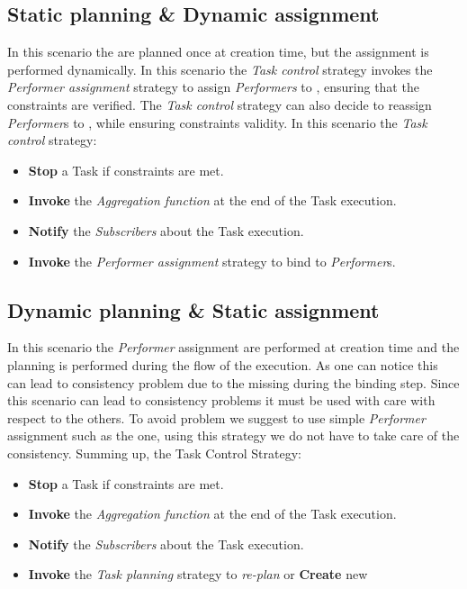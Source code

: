 \subsection{Static \utask{} planning \& Dynamic assignment}
\label{subs:static-dynamic}
In this scenario the \utask{} are planned once at creation time, but the
assignment is performed dynamically. In this scenario the \emph{Task control}
strategy invokes the \emph{Performer assignment} strategy to assign
\emph{Performers} to \utask{}, ensuring that the constraints are verified. The
\emph{Task control} strategy can also decide to reassign \emph{Performer}s to
\utask{}, while ensuring constraints validity. In
this scenario the \emph{Task control} strategy:
\begin{itemize}
	\item \textbf{Stop} a Task if constraints are met.
	\item \textbf{Invoke} the \emph{Aggregation function} at the end of the Task
	execution.
	\item \textbf{Notify} the \emph{Subscribers} about the Task execution.
	\item \textbf{Invoke} the \emph{Performer assignment} strategy to bind \utask{}
	to \emph{Performer}s.
\end{itemize}





\subsection{Dynamic \utask{} planning \& Static assignment}
\label{subs:dynamic-static}
In this scenario the \emph{Performer} assignment are performed at creation time
and the \utask{} planning is performed during the flow of the execution.
As one can notice this can lead to consistency problem due to the missing
\utask{} during the binding step. Since this scenario can lead to consistency
problems it must be used with care with respect to the others. To avoid problem
we suggest to use simple \emph{Performer} assignment such as the 
one, using this strategy we do not have to take care of the consistency.
Summing up, the Task Control Strategy:
\begin{itemize}
	\item \textbf{Stop} a Task if constraints are met.
	\item \textbf{Invoke} the \emph{Aggregation function} at the end of the Task
	execution.
	\item \textbf{Notify} the \emph{Subscribers} about the Task execution.
	\item \textbf{Invoke} the \emph{Task planning} strategy to \emph{re-plan}
	\utask{} or \textbf{Create} new \utask{}
\end{itemize}



